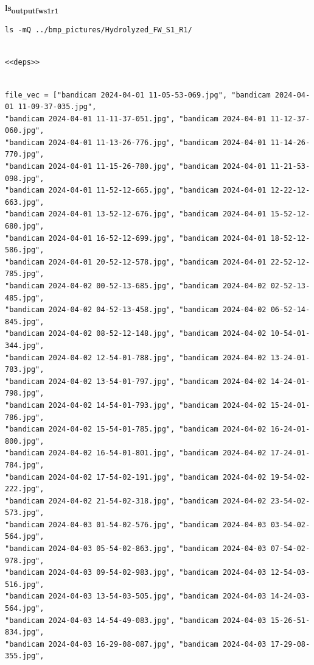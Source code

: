 \documentclass[11pt]{article}
\begin{document}
\textbf{ls\textsubscript{output}\textsubscript{fw}\textsubscript{s1}\textsubscript{r1}}
\begin{verbatim}
ls -mQ ../bmp_pictures/Hydrolyzed_FW_S1_R1/
\end{verbatim}

\begin{verbatim}

<<deps>>

\end{verbatim}

\begin{verbatim}

file_vec = ["bandicam 2024-04-01 11-05-53-069.jpg", "bandicam 2024-04-01 11-09-37-035.jpg",
"bandicam 2024-04-01 11-11-37-051.jpg", "bandicam 2024-04-01 11-12-37-060.jpg",
"bandicam 2024-04-01 11-13-26-776.jpg", "bandicam 2024-04-01 11-14-26-770.jpg",
"bandicam 2024-04-01 11-15-26-780.jpg", "bandicam 2024-04-01 11-21-53-098.jpg",
"bandicam 2024-04-01 11-52-12-665.jpg", "bandicam 2024-04-01 12-22-12-663.jpg",
"bandicam 2024-04-01 13-52-12-676.jpg", "bandicam 2024-04-01 15-52-12-680.jpg",
"bandicam 2024-04-01 16-52-12-699.jpg", "bandicam 2024-04-01 18-52-12-586.jpg",
"bandicam 2024-04-01 20-52-12-578.jpg", "bandicam 2024-04-01 22-52-12-785.jpg",
"bandicam 2024-04-02 00-52-13-685.jpg", "bandicam 2024-04-02 02-52-13-485.jpg",
"bandicam 2024-04-02 04-52-13-458.jpg", "bandicam 2024-04-02 06-52-14-845.jpg",
"bandicam 2024-04-02 08-52-12-148.jpg", "bandicam 2024-04-02 10-54-01-344.jpg",
"bandicam 2024-04-02 12-54-01-788.jpg", "bandicam 2024-04-02 13-24-01-783.jpg",
"bandicam 2024-04-02 13-54-01-797.jpg", "bandicam 2024-04-02 14-24-01-798.jpg",
"bandicam 2024-04-02 14-54-01-793.jpg", "bandicam 2024-04-02 15-24-01-786.jpg",
"bandicam 2024-04-02 15-54-01-785.jpg", "bandicam 2024-04-02 16-24-01-800.jpg",
"bandicam 2024-04-02 16-54-01-801.jpg", "bandicam 2024-04-02 17-24-01-784.jpg",
"bandicam 2024-04-02 17-54-02-191.jpg", "bandicam 2024-04-02 19-54-02-222.jpg",
"bandicam 2024-04-02 21-54-02-318.jpg", "bandicam 2024-04-02 23-54-02-573.jpg",
"bandicam 2024-04-03 01-54-02-576.jpg", "bandicam 2024-04-03 03-54-02-564.jpg",
"bandicam 2024-04-03 05-54-02-863.jpg", "bandicam 2024-04-03 07-54-02-978.jpg",
"bandicam 2024-04-03 09-54-02-983.jpg", "bandicam 2024-04-03 12-54-03-516.jpg",
"bandicam 2024-04-03 13-54-03-505.jpg", "bandicam 2024-04-03 14-24-03-564.jpg",
"bandicam 2024-04-03 14-54-49-083.jpg", "bandicam 2024-04-03 15-26-51-834.jpg",
"bandicam 2024-04-03 16-29-08-087.jpg", "bandicam 2024-04-03 17-29-08-355.jpg",

\end{verbatim}
\end{document}
